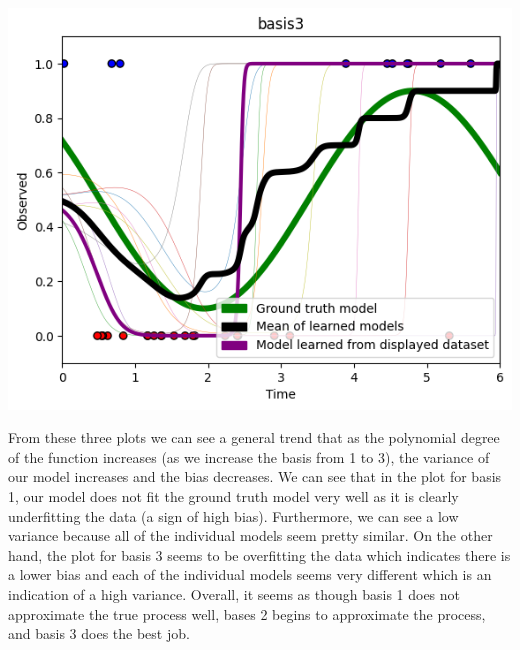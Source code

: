 \documentclass[submit]{harvardml}
\begin{document}
\begin{enumerate}
\begin{center}
         \includegraphics[scale=0.4]{hw2/images/q1_basis3.png}\\
     \end{center}
     From these three plots we can see a general trend that as the polynomial degree of the function increases (as we increase the basis from 1 to 3), the variance of our model increases and the bias decreases. We can see that in the plot for basis 1, our model does not fit the ground truth model very well as it is clearly underfitting the data (a sign of high bias). Furthermore, we can see a low variance because all of the individual models seem pretty similar. On the other hand, the plot for basis 3 seems to be overfitting the data which indicates there is a lower bias and each of the individual models seems very different which is an indication of a high variance. Overall, it seems as though basis 1 does not approximate the true process well, bases 2 begins to approximate the process, and basis 3 does the best job. \\
     

\end{enumerate}
\end{document}
